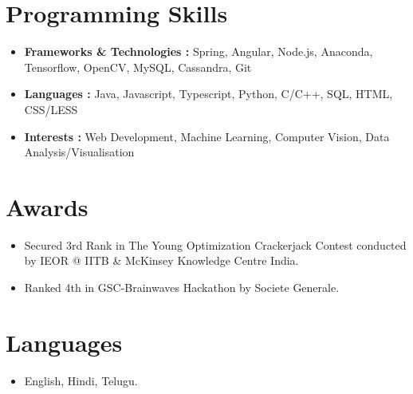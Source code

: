 \documentclass[letterpaper,11pt]{article}
\newcommand{\resumeSubHeadingListStart}{\begin{itemize}[leftmargin=*]}
\newcommand{\resumeSubHeadingListEnd}{\end{itemize}}
\begin{document}
\section{Programming Skills}
  \resumeSubHeadingListStart
    \item{
      \textbf{Frameworks \& Technologies : }{Spring, Angular, Node.js, Anaconda, Tensorflow, OpenCV, MySQL, Cassandra, Git}
    }
    \item{
      \textbf{Languages : }{Java, Javascript, Typescript, Python, C/C++, SQL, HTML, CSS/LESS}
    }
    \item{
      \textbf{Interests : }{Web Development, Machine Learning, Computer Vision, Data Analysis/Visualisation}
    }
  \resumeSubHeadingListEnd
  
\section{Awards}
  \resumeSubHeadingListStart
    \item{
      {Secured 3rd Rank in The Young Optimization Crackerjack Contest conducted by IEOR @ IITB \& McKinsey Knowledge Centre India.}
    }
    \item{
      {Ranked 4th in GSC-Brainwaves Hackathon by Societe Generale.}
    }
  \resumeSubHeadingListEnd

\section{Languages}
  \resumeSubHeadingListStart
    \item{
      {English, Hindi, Telugu.}
    }
  \resumeSubHeadingListEnd

\end{document}
